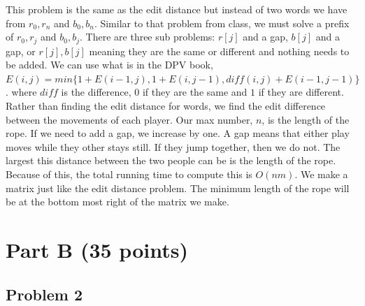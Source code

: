 \documentclass[11pt]{article}
\begin{document}
This problem is the same as the edit distance but instead of two words we have from $r_0,r_n$ and $b_0,b_n$. Similar to that problem from class, we must solve a prefix of $r_0,r_j$ and $b_0,b_j$. There are three sub problems: $r[j]$ and a gap, $b[j]$ and a gap, or $r[j],b[j]$ meaning they are the same or different and nothing needs to be added. We can use what is in the DPV book, $E(i,j) = min\{1+E(i-1,j), 1+E(i,j-1), diff(i,j)+E(i-1,j-1)\}$. where $diff$ is the difference, $0$ if they are the same and $1$ if they are different. Rather than finding the edit distance for words, we find the edit difference between the movements of each player. Our max number, $n$, is the length of the rope. If we need to add a gap, we increase by one. A gap means that either play moves while they other stays still. If they jump together, then we do not. The largest this distance between the two people can be is the length of the rope. Because of this, the total running time to compute this is $O(nm)$. We make a matrix just like the edit distance problem. The minimum length of the rope will be at the bottom most right of the matrix we make.

\section*{Part B (35 points)}

\subsection*{Problem 2}
\end{document}
